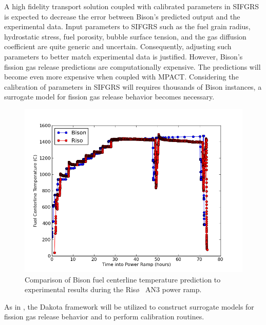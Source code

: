 A high fidelity transport solution coupled with calibrated parameters in \ac{SIFGRS} is expected to decrease the error between Bison's predicted output and the experimental data. Input parameters to \ac{SIFGRS} such as the fuel grain radius, hydrostatic stress, fuel porosity, bubble surface tension, and the gas diffusion coefficient are quite generic and uncertain. Consequently, adjusting such parameters to better match experimental data is justified. However, Bison's fission gas release predictions are computationally expensive. The predictions will become even more expensive when coupled with \ac{MPACT}. Considering the calibration of parameters in \ac{SIFGRS} will requires thousands of Bison instances, a surrogate model for fission gas release behavior becomes necessary. 
\begin{figure}
\caption{\label{fig:riso_tc_temp}
Comparison of Bison fuel centerline temperature prediction to experimental results during the Ris\o~ AN3 power ramp.}
 \begin{center}
  \includegraphics[scale=.75]{./Ongoing_Work/tc_temp_comparison.png}
 \end{center}
\end{figure} 
As in \cite{Swiler}, the Dakota framework will be utilized to construct surrogate models for fission gas release behavior and to perform calibration routines. 

